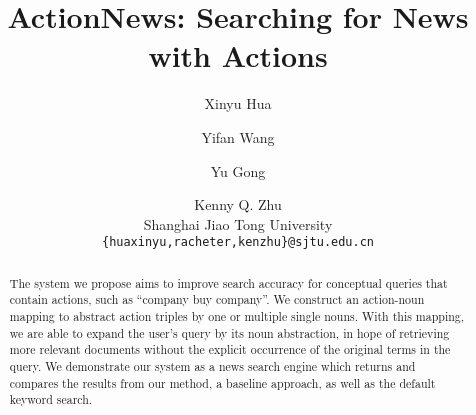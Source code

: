 \documentclass[11pt]{article}
\title{ActionNews: Searching for News with Actions}
\author{Xinyu Hua \and Yifan Wang \and Yu Gong \and Kenny Q. Zhu  \\
  Shanghai Jiao Tong University \\
  {\tt \{huaxinyu,racheter,kenzhu\}@sjtu.edu.cn} \\
  }
\date{}
\begin{document}
\maketitle
\begin{abstract}
The system we propose aims to improve search accuracy for 
conceptual queries that contain actions, 
such as ``company buy company''.
We construct an action-noun mapping to abstract action triples 
by one or multiple single nouns. With this mapping, we are able 
to expand the user's query by its noun abstraction, 
in hope of retrieving more relevant documents without the explicit 
occurrence of the original terms in the query. 
We demonstrate our system as a news search engine which returns and
compares the results from our method, a baseline approach, 
as well as the default keyword search. 
\end{abstract}
















\end{document}
